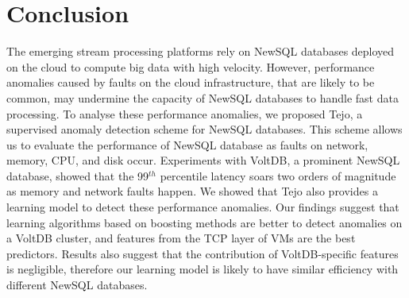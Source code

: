 \section{Conclusion}
\label{sec:conclusion}

The emerging stream processing platforms rely on NewSQL databases deployed on the cloud to compute big data with high velocity. However, performance anomalies caused by faults on the cloud infrastructure, that are likely to be common, may undermine the capacity of NewSQL databases to handle fast data processing. To analyse these performance anomalies, we proposed Tejo, a supervised anomaly detection scheme for NewSQL databases. This scheme allows us to evaluate the performance of NewSQL database as faults on network, memory, CPU, and disk occur. Experiments with VoltDB, a prominent NewSQL database, showed that the 99$^{th}$ percentile latency soars two orders of magnitude as memory and network faults happen. We showed that Tejo also provides a learning model to detect these performance anomalies. Our findings suggest that learning algorithms based on boosting methods are better to detect anomalies on a VoltDB cluster, and features from the TCP layer of VMs are the best predictors. Results also suggest that the contribution of VoltDB-specific features is negligible, therefore our learning model is likely to have similar efficiency with different NewSQL databases.
